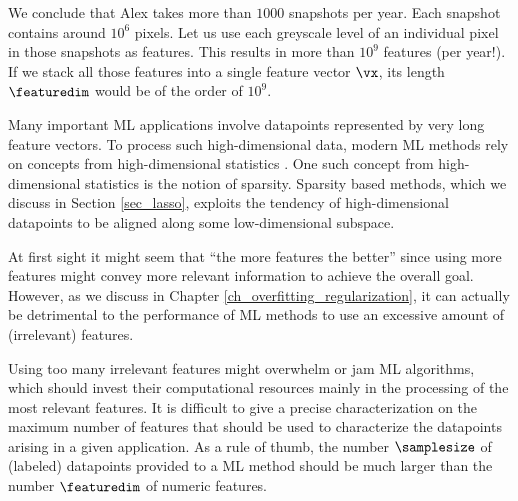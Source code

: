 \documentclass[12pt]{report}
\newcommand{\featurelen}{\featuredim}
\begin{document}
We conclude that Alex takes more than $1000$ snapshots per year. 
Each snapshot contains around $10^{6}$ pixels. Let us use each  
greyscale level of an individual pixel in those snapshots as features. 
This results in more than $10^{9}$ features (per year!). If we stack all 
those features into a single feature vector $\vx$, its length $\featurelen$ 
would be of the order of $10^{9}$. 

Many important ML applications involve datapoints represented by very 
long feature vectors. To process such high-dimensional data, modern 
ML methods rely on concepts from high-dimensional statistics \cite{BuhlGeerBook,Wain2019}. 
One such concept from high-dimensional statistics is the notion 
of sparsity. Sparsity based methods, which we discuss in Section \ref{sec_lasso}, 
exploits the tendency of high-dimensional datapoints to be aligned along 
some low-dimensional subspace.  



At first sight it might seem that ``the more features the better'' 
since using more features might convey more relevant information 
to achieve the overall goal. However, as we discuss in Chapter \ref{ch_overfitting_regularization}, 
it can actually be detrimental to the performance of ML methods 
to use an excessive amount of (irrelevant) features. 

Using too many irrelevant features might overwhelm or jam ML 
algorithms, which should invest their computational resources 
mainly in the processing of the most relevant features. It is difficult 
to give a precise characterization on the maximum number of 
features that should be used to characterize the datapoints 
arising in a given application. As a rule of thumb, the number $\samplesize$ 
of (labeled) datapoints provided to a ML method should be 
much larger than the number $\featurelen$ of numeric features.
\end{document}
